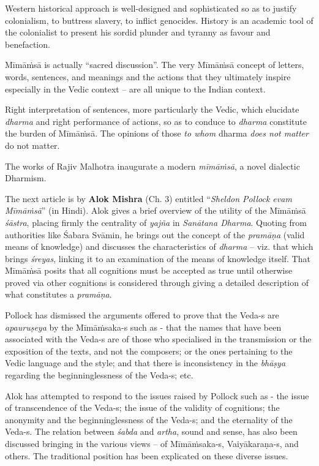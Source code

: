 Western historical approach is well-designed and sophisticated so as to justify colonialism, to buttress slavery, to inflict genocides. History is an academic tool of the colonialist to present his sordid plunder and tyranny as favour and benefaction.

Mīmāṁsā is actually “sacred discussion”. The very Mīmāṁsā concept of letters, words, sentences, and meanings and the actions that they ultimately inspire especially in the Vedic context – are all unique to the Indian context.

Right interpretation of sentences, more particularly the Vedic, which elucidate \textit{dharma} and right performance of actions, so as to conduce to \textit{dharma} constitute the burden of Mīmāṁsā. The opinions of those \textit{to whom} dharma \textit{does not matter} do not matter.

The works of Rajiv Malhotra inaugurate a modern \textit{mīmāṁsā}, a novel dialectic Dharmism.

The next article is by \textbf{Alok Mishra} (Ch. 3) entitled “\textit{Sheldon Pollock evam Mīmāṁsā}” (in Hindi). Alok gives a brief overview of the utility of the Mīmāṁsā \textit{śāstra}, placing firmly the centrality of \textit{yajña} in \textit{Sanātana Dharma}. Quoting from authorities like Śabara Svāmin, he brings out the concept of the \textit{pramāṇa} (valid means of knowledge) and discusses the characteristics of \textit{dharma} – viz. that which brings \textit{śreyas}, linking it to an examination of the means of knowledge itself. That Mīmāṁsā posits that all cognitions must be accepted as true until otherwise proved via other cognitions is considered through giving a detailed description of what constitutes a \textit{pramāṇa}.

Pollock has dismissed the arguments offered to prove that the Veda-s are \textit{apauruṣeya} by the Mīmāṁsaka-s such as - that the names that have been associated with the Veda-s are of those who specialised in the transmission or the exposition of the texts, and not the composers; or the ones pertaining to the Vedic language and the style; and that there is inconsistency in the \textit{bhāṣya} regarding the beginninglessness of the Veda-s; etc.

Alok has attempted to respond to the issues raised by Pollock such as - the issue of transcendence of the Veda-s; the issue of the validity of cognitions; the anonymity and the beginninglessness of the Veda-s; and the eternality of the Veda-s. The relation between \textit{śabda} and \textit{artha}, sound and sense, has also been discussed bringing in the various views – of Mīmāṁsaka-s, Vaiyākaraṇa-s, and others. The traditional position has been explicated on these diverse issues.

